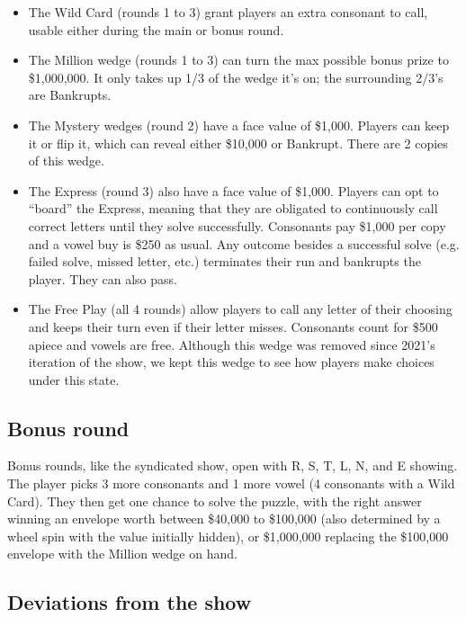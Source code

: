 \begin{itemize}
  \item The Wild Card (rounds 1 to 3) grant players an extra consonant to call, usable either during the main or bonus round.
  \item The Million wedge (rounds 1 to 3) can turn the max possible bonus prize to \$1,000,000. It only takes up 1/3 of the wedge it's on; the surrounding 2/3's are Bankrupts.
  \item The Mystery wedges (round 2) have a face value of \$1,000. Players can keep it or flip it, which can reveal either \$10,000 or Bankrupt. There are 2 copies of this wedge.
  \item The Express (round 3) also have a face value of \$1,000. Players can opt to ``board'' the Express, meaning that they are obligated to continuously call correct letters until they solve successfully. Consonants pay \$1,000 per copy and a vowel buy is \$250 as usual. Any outcome besides a successful solve (e.g. failed solve, missed letter, etc.) terminates their run and bankrupts the player. They can also pass.
  \item The Free Play (all 4 rounds) allow players to call any letter of their choosing and keeps their turn even if their letter misses. Consonants count for \$500 apiece and vowels are free. Although this wedge was removed since 2021's iteration of the show, we kept this wedge to see how players make choices under this state.
\end{itemize}

\subsection{Bonus round}

Bonus rounds, like the syndicated show, open with R, S, T, L, N, and E showing. The player picks 3 more consonants and 1 more vowel (4 consonants with a Wild Card). They then get one chance to solve the puzzle, with the right answer winning an envelope worth between \$40,000 to \$100,000 (also determined by a wheel spin with the value initially hidden), or \$1,000,000 replacing the \$100,000 envelope with the Million wedge on hand.

\subsection{Deviations from the show}

